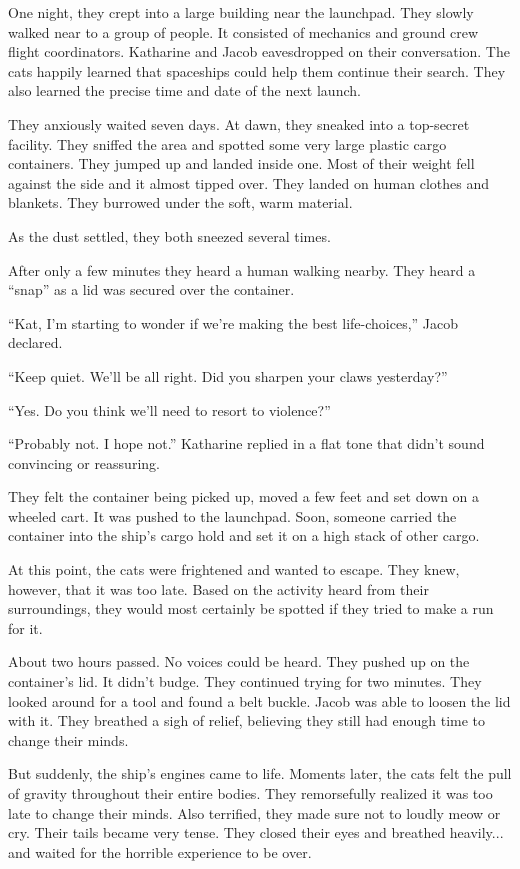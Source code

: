 One night, they crept into a large building near the launchpad. They slowly walked near to a group of people. It consisted of mechanics and ground crew flight coordinators. Katharine and Jacob eavesdropped on their conversation. The cats happily learned that spaceships could help them continue their search. They also learned the precise time and date of the next launch.

They anxiously waited seven days. At dawn, they sneaked into a top-secret facility. They sniffed the area and spotted some very large plastic cargo containers. They jumped up and landed inside one. Most of their weight fell against the side and it almost tipped over. They landed on human clothes and blankets. They burrowed under the soft, warm material.

As the dust settled, they both sneezed several times.

After only a few minutes they heard a human walking nearby. They heard a “snap” as a lid was secured over the container.

“Kat, I'm starting to wonder if we're making the best life-choices,” Jacob declared.

“Keep quiet. We'll be all right. Did you sharpen your claws yesterday?”

“Yes. Do you think we'll need to resort to violence?”

“Probably not. I hope not.” Katharine replied in a flat tone that didn't sound convincing or reassuring.

They felt the container being picked up, moved a few feet and set down on a wheeled cart. It was pushed to the launchpad. Soon, someone carried the container into the ship's cargo hold and set it on a high stack of other cargo.

At this point, the cats were frightened and wanted to escape. They knew, however, that it was too late. Based on the activity heard from their surroundings, they would most certainly be spotted if they tried to make a run for it.

About two hours passed. No voices could be heard. They pushed up on the container's lid. It didn't budge. They continued trying for two minutes. They looked around for a tool and found a belt buckle. Jacob was able to loosen the lid with it. They breathed a sigh of relief, believing they still had enough time to change their minds.

But suddenly, the ship's engines came to life. Moments later, the cats felt the pull of gravity throughout their entire bodies. They remorsefully realized it was too late to change their minds. Also terrified, they made sure not to loudly meow or cry. Their tails became very tense. They closed their eyes and breathed heavily... and waited for the horrible experience to be over.

